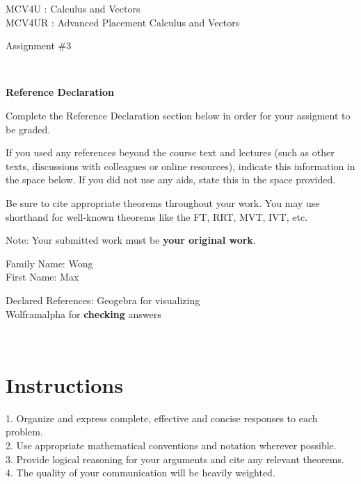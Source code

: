 \documentclass[12pt]{book}
\begin{document}
\vspace{-1.0in}\begin{center}
\Large{MCV4U : Calculus and Vectors}\\
\Large{MCV4UR : Advanced Placement Calculus and Vectors }

\Large{Assignment \#3}


\end{center}


\vspace{0.015in}\hrulefill\ 

\textbf{Reference Declaration} %

Complete the Reference Declaration section below in order for your assigment to be graded.

If you used any references beyond the course text and lectures (such as other texts, discussions with colleagues or online resources), indicate this information in the space below.  If you did not use any aids, state this in the space provided. 

Be sure to cite appropriate theorems throughout your work. You may use shorthand for well-known theorems like the FT, RRT, MVT, IVT, etc. 

Note: Your submitted work must be \textbf{your original work}. 

Family Name: Wong\\%
First Name: Max%

Declared References: 
Geogebra for visualizing\\
Wolframalpha for \textbf{checking} answers

\vspace{0.015in}\hrulefill\ 

\newpage

\section*{Instructions}

\begin{center}
\setlength{\fboxrule}{2pt}
\begin{boxedminipage}{6.5in}
1.	Organize and express complete, effective and concise responses to each problem.\\
2.	Use appropriate mathematical conventions and notation wherever possible.\\
3.	Provide logical reasoning for your arguments and cite any relevant theorems. \\
4.  The quality of your communication will be heavily weighted.
\end{boxedminipage}
\end{center} 
\end{document}
